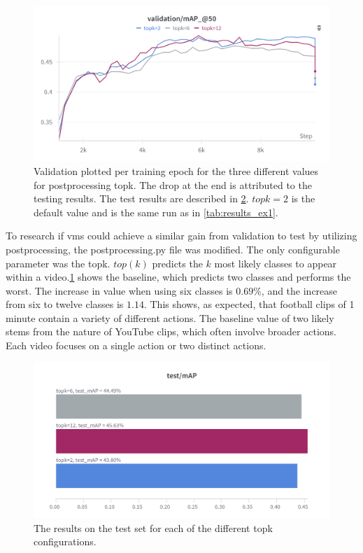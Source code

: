 \begin{figure}[h]
    \centering
    \includegraphics[width=\linewidth]{figures/valid_topk_2.png}
    \caption{Validation plotted per training epoch for the three different values for postprocessing topk. The drop at the end is attributed to the testing results. The test results are described in \cref{fig:topk_test_map}. \(topk=2\) is the default value and is the same run as in \cref{tab:results_ex1}.}
    \label{fig:topk}
\end{figure}

To research if \acrshort{vms} could achieve a similar gain from validation to test by utilizing postprocessing, the postprocessing.py file was modified. The only configurable parameter was the topk. $top (k)$ predicts the $k$ most likely classes to appear within a video.\cref{fig:topk} shows the baseline, which predicts two classes and performs the worst. The increase in value when using six classes is $0.69\%$, and the increase from six to twelve classes is $1.14$. This shows, as expected, that football clips of 1 minute contain a variety of different actions. The baseline value of two likely stems from the nature of YouTube clips, which often involve broader actions. Each video focuses on a single action or two distinct actions. 

\begin{figure}
    \centering
    \includegraphics[width=\linewidth]{figures/topk_test_map.png}
    \caption{The results on the test set for each of the different topk configurations. }
    \label{fig:topk_test_map}
\end{figure}

